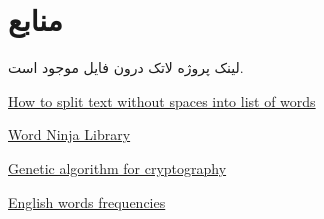 \section{منابع}

لینک پروژه لاتک درون فایل
موجود است.

\vspace{1cm}
\small

\begin{latin}
    \href{https://exchangetuts.com/how-to-split-text-without-spaces-into-list-of-words-1639498085014014}{How to split text without spaces into list of words}
    \newline
    
    \href{https://github.com/keredson/wordninjak}{Word Ninja Library}
    \newline
    
    \href{http://ijcsn.org/IJCSN-2017/6-3/Encryption-and-Decryption-Using-Genetic-Algorithm-Operations-and-Pseudorandom-Number.pdf}{Genetic algorithm for cryptography}
    \newline
    
    \href{https://github.com/alseambusher/columbus/blob/master/words-by-frequency.txt}{English words frequencies}
    \newline
\end{latin}
